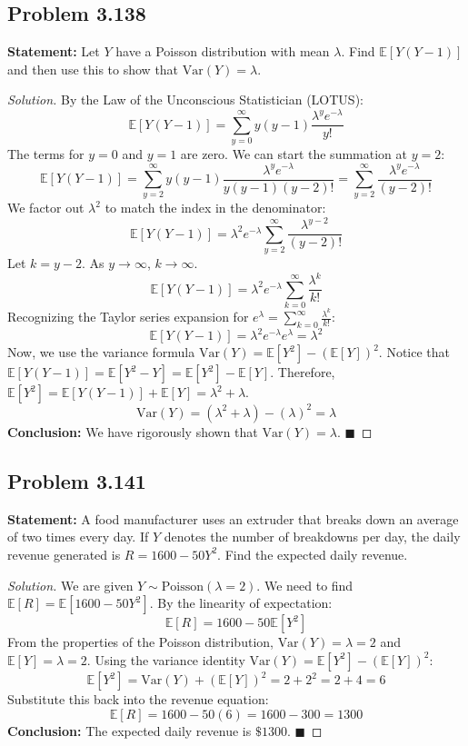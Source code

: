 \documentclass[11pt]{article}
\theoremstyle{definition}
\theoremstyle{remark}
\begin{document}
\subsection*{Problem 3.138}
\textbf{Statement:} Let $Y$ have a Poisson distribution with mean $\lambda$. Find $\mathbb{E}[Y(Y-1)]$ and then use this to show that $\text{Var}(Y) = \lambda$.

\begin{proof}[Solution]
By the Law of the Unconscious Statistician (LOTUS):
\[ \mathbb{E}[Y(Y-1)] = \sum_{y=0}^{\infty} y(y-1) \frac{\lambda^y e^{-\lambda}}{y!} \]
The terms for $y=0$ and $y=1$ are zero. We can start the summation at $y=2$:
\[ \mathbb{E}[Y(Y-1)] = \sum_{y=2}^{\infty} y(y-1) \frac{\lambda^y e^{-\lambda}}{y(y-1)(y-2)!} = \sum_{y=2}^{\infty} \frac{\lambda^y e^{-\lambda}}{(y-2)!} \]
We factor out $\lambda^2$ to match the index in the denominator:
\[ \mathbb{E}[Y(Y-1)] = \lambda^2 e^{-\lambda} \sum_{y=2}^{\infty} \frac{\lambda^{y-2}}{(y-2)!} \]
Let $k = y - 2$. As $y \to \infty$, $k \to \infty$.
\[ \mathbb{E}[Y(Y-1)] = \lambda^2 e^{-\lambda} \sum_{k=0}^{\infty} \frac{\lambda^k}{k!} \]
Recognizing the Taylor series expansion for $e^\lambda = \sum_{k=0}^{\infty} \frac{\lambda^k}{k!}$:
\[ \mathbb{E}[Y(Y-1)] = \lambda^2 e^{-\lambda} e^\lambda = \lambda^2 \]
Now, we use the variance formula $\text{Var}(Y) = \mathbb{E}[Y^2] - (\mathbb{E}[Y])^2$.
Notice that $\mathbb{E}[Y(Y-1)] = \mathbb{E}[Y^2 - Y] = \mathbb{E}[Y^2] - \mathbb{E}[Y]$.
Therefore, $\mathbb{E}[Y^2] = \mathbb{E}[Y(Y-1)] + \mathbb{E}[Y] = \lambda^2 + \lambda$.
\[ \text{Var}(Y) = (\lambda^2 + \lambda) - (\lambda)^2 = \lambda \]
\textbf{Conclusion:} We have rigorously shown that $\text{Var}(Y) = \lambda$. $\blacksquare$
\end{proof}

\subsection*{Problem 3.141}
\textbf{Statement:} A food manufacturer uses an extruder that breaks down an average of two times every day. If $Y$ denotes the number of breakdowns per day, the daily revenue generated is $R = 1600 - 50Y^2$. Find the expected daily revenue.

\begin{proof}[Solution]
We are given $Y \sim \text{Poisson}(\lambda = 2)$. We need to find $\mathbb{E}[R] = \mathbb{E}[1600 - 50Y^2]$.
By the linearity of expectation:
\[ \mathbb{E}[R] = 1600 - 50\mathbb{E}[Y^2] \]
From the properties of the Poisson distribution, $\text{Var}(Y) = \lambda = 2$ and $\mathbb{E}[Y] = \lambda = 2$.
Using the variance identity $\text{Var}(Y) = \mathbb{E}[Y^2] - (\mathbb{E}[Y])^2$:
\[ \mathbb{E}[Y^2] = \text{Var}(Y) + (\mathbb{E}[Y])^2 = 2 + 2^2 = 2 + 4 = 6 \]
Substitute this back into the revenue equation:
\[ \mathbb{E}[R] = 1600 - 50(6) = 1600 - 300 = 1300 \]
\textbf{Conclusion:} The expected daily revenue is $\$1300$. $\blacksquare$
\end{proof}
\end{document}
